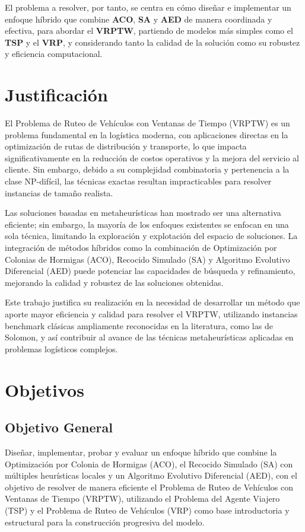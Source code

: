 \documentclass[12pt,titlepage,twoside,openright]{book}
\begin{document}
El problema a resolver, por tanto, se centra en cómo diseñar e implementar un enfoque híbrido que combine \textbf{ACO}, \textbf{SA} y \textbf{AED} de manera coordinada y efectiva, para abordar el \textbf{VRPTW}, partiendo de modelos más simples como el \textbf{TSP} y el \textbf{VRP}, y considerando tanto la calidad de la solución como su robustez y eficiencia computacional.

\section{Justificación}

El Problema de Ruteo de Vehículos con Ventanas de Tiempo (VRPTW) es un problema fundamental en la logística moderna, con aplicaciones directas en la optimización de rutas de distribución y transporte, lo que impacta significativamente en la reducción de costos operativos y la mejora del servicio al cliente. Sin embargo, debido a su complejidad combinatoria y pertenencia a la clase NP-difícil, las técnicas exactas resultan impracticables para resolver instancias de tamaño realista.

Las soluciones basadas en metaheurísticas han mostrado ser una alternativa eficiente; sin embargo, la mayoría de los enfoques existentes se enfocan en una sola técnica, limitando la exploración y explotación del espacio de soluciones. La integración de métodos híbridos como la combinación de Optimización por Colonias de Hormigas (ACO), Recocido Simulado (SA) y Algoritmo Evolutivo Diferencial (AED) puede potenciar las capacidades de búsqueda y refinamiento, mejorando la calidad y robustez de las soluciones obtenidas.

Este trabajo justifica su realización en la necesidad de desarrollar un método que aporte mayor eficiencia y calidad para resolver el VRPTW, utilizando instancias benchmark clásicas ampliamente reconocidas en la literatura, como las de Solomon, y así contribuir al avance de las técnicas metaheurísticas aplicadas en problemas logísticos complejos.

\section{Objetivos}

\subsection{Objetivo General}

Diseñar, implementar, probar y evaluar un enfoque híbrido que combine la Optimización por Colonia de Hormigas (ACO), el Recocido Simulado (SA) con múltiples heurísticas locales y un Algoritmo Evolutivo Diferencial (AED), con el objetivo de resolver de manera eficiente el Problema de Ruteo de Vehículos con Ventanas de Tiempo (VRPTW), utilizando el Problema del Agente Viajero (TSP) y el Problema de Ruteo de Vehículos (VRP) como base introductoria y estructural para la construcción progresiva del modelo.
\end{document}

